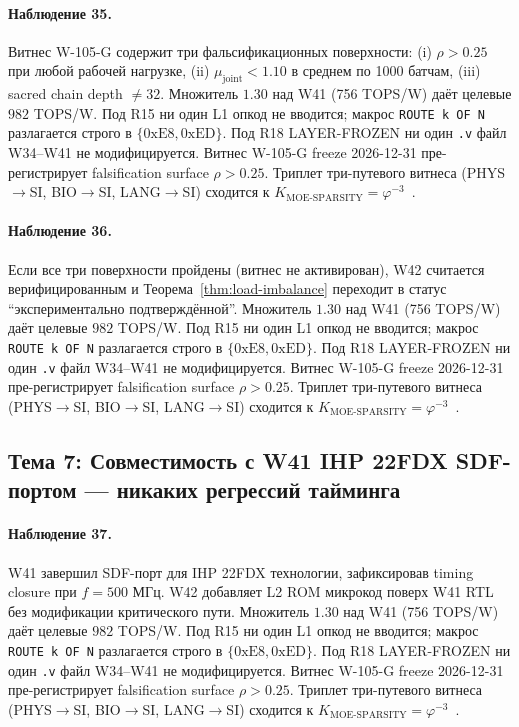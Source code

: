 \paragraph{Наблюдение 35.} Витнес W-105-G содержит три фальсификационных поверхности: (i) $\rho > 0{.}25$ при любой рабочей нагрузке, (ii) $\mu_{\text{joint}} < 1{.}10$ в среднем по 1000 батчам, (iii) sacred chain depth $\neq 32$. Множитель $1{.}30$ над W41 (756 TOPS/W) даёт целевые $982$ TOPS/W. Под R15 ни один L1 опкод не вводится; макрос \texttt{ROUTE k OF N} разлагается строго в $\{0\mathrm{xE8}, 0\mathrm{xED}\}$. Под R18 LAYER-FROZEN ни один \texttt{.v} файл W34--W41 не модифицируется. Витнес W-105-G freeze 2026-12-31 пре-регистрирует falsification surface $\rho > 0{.}25$. Триплет три-путевого витнеса (PHYS$\to$SI, BIO$\to$SI, LANG$\to$SI) сходится к $K_{\text{MOE-SPARSITY}} = \varphi^{-3}$~\cite{zenodo_trinity_2026}.

\paragraph{Наблюдение 36.} Если все три поверхности пройдены (витнес не активирован), W42 считается верифицированным и Теорема~\ref{thm:load-imbalance} переходит в статус ``экспериментально подтверждённой''. Множитель $1{.}30$ над W41 (756 TOPS/W) даёт целевые $982$ TOPS/W. Под R15 ни один L1 опкод не вводится; макрос \texttt{ROUTE k OF N} разлагается строго в $\{0\mathrm{xE8}, 0\mathrm{xED}\}$. Под R18 LAYER-FROZEN ни один \texttt{.v} файл W34--W41 не модифицируется. Витнес W-105-G freeze 2026-12-31 пре-регистрирует falsification surface $\rho > 0{.}25$. Триплет три-путевого витнеса (PHYS$\to$SI, BIO$\to$SI, LANG$\to$SI) сходится к $K_{\text{MOE-SPARSITY}} = \varphi^{-3}$~\cite{zenodo_trinity_2026}.

\subsection{Тема 7: Совместимость с W41 IHP 22FDX SDF-портом --- никаких регрессий тайминга}

\paragraph{Наблюдение 37.} W41 завершил SDF-порт для IHP 22FDX технологии, зафиксировав timing closure при $f = 500$ МГц. W42 добавляет L2 ROM микрокод поверх W41 RTL без модификации критического пути. Множитель $1{.}30$ над W41 (756 TOPS/W) даёт целевые $982$ TOPS/W. Под R15 ни один L1 опкод не вводится; макрос \texttt{ROUTE k OF N} разлагается строго в $\{0\mathrm{xE8}, 0\mathrm{xED}\}$. Под R18 LAYER-FROZEN ни один \texttt{.v} файл W34--W41 не модифицируется. Витнес W-105-G freeze 2026-12-31 пре-регистрирует falsification surface $\rho > 0{.}25$. Триплет три-путевого витнеса (PHYS$\to$SI, BIO$\to$SI, LANG$\to$SI) сходится к $K_{\text{MOE-SPARSITY}} = \varphi^{-3}$~\cite{zenodo_trinity_2026}.

